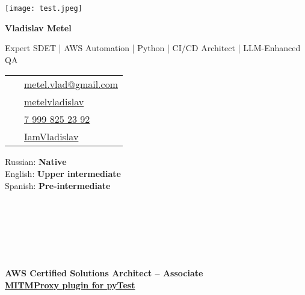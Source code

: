 	\begin{minipage}[t]{0.33\textwidth} %
		\colorbox{cvblue!90}{\color{white}  %
			\textwidth\relax%
			\begin{minipage}[t][297mm][t]{0.82\textwidth}
				\raggedright
				\vspace*{2ex} %
				\null\hfill\texttt{[image: test.jpeg]}\hfill\null

				
				\vspace*{1.5ex}
				
				\Large  \textbf{Vladislav Metel} \normalsize 
				
				\vspace*{1.5ex}
				
				Expert SDET | AWS Automation | Python | CI/CD Architect | LLM-Enhanced QA
				
				
				\begin{tabular}{ @{}c l }
					\Letter\ & \href{mailto:metel.vlad@gmail.com?subject=Job Opportunity}{metel.vlad@gmail.com} \\
					\faLinkedin\ & \href{https://www.linkedin.com/in/metelvladislav}{metelvladislav} \\
					\faMobile*\ & \href{tel:+7 999 825 23 92}{\raisebox{0.2ex}{+}7 999 825 23 92} \\
					\faGithub\ & \href{https://github.com/IamVladislav}{IamVladislav} \\
				\end{tabular}
				
				Russian: \textbf{Native} \\[2pt]
				English: \textbf{Upper intermediate} \\[2pt]
				Spanish: \textbf{Pre-intermediate}
				
				
				 \\[1pt]
				 \\[1pt]
				 \\[1pt]
				 \\[1pt]
				 \\[1pt]
				
								
				\textbf{AWS Certified Solutions Architect – Associate} \\[1pt]
				\textbf{\href{https://github.com/IamVladislav/pytest-mitmproxy-plugin}{MITMProxy plugin for pyTest}}
			\end{minipage}%
			\textwidth\relax%
		}
	\end{minipage}%
